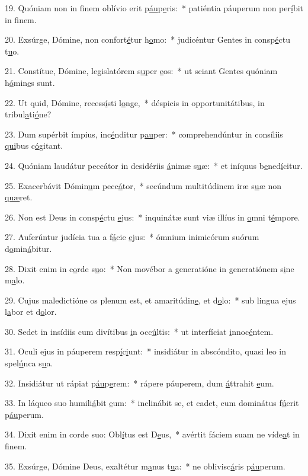 19. Quóniam non in finem oblívio erit p\uline{áu}p\uline{e}ris:~* patiéntia páuperum non per\uline{í}bit in f\uline{i}nem.\par 
20. Exsúrge, Dómine, non confort\uline{é}tur h\uline{o}mo:~* judicéntur Gentes in consp\uline{é}ctu t\uline{u}o.\par 
21. Constítue, Dómine, legislatórem s\uline{u}per \uline{e}os:~* ut sciant Gentes quóniam h\uline{ó}min\uline{e}s sunt.\par 
22. Ut quid, Dómine, recess\uline{í}sti l\uline{o}nge,~* déspicis in opportunitátibus, in tribul\uline{a}ti\uline{ó}ne?\par 
23. Dum supérbit ímpius, inc\uline{é}nditur p\uline{au}per:~* comprehendúntur in consíliis \uline{qui}bus c\uline{ó}gitant.\par 
24. Quóniam laudátur peccátor in desidériis \uline{á}nimæ s\uline{u}æ:~* et iníquus b\uline{e}ned\uline{í}citur.\par 
25. Exacerbávit Dómin\uline{u}m pecc\uline{á}tor,~* secúndum multitúdinem iræ s\uline{u}æ non \uline{quæ}ret.\par 
26. Non est Deus in consp\uline{é}ctu \uline{e}jus:~* inquinátæ sunt viæ illíus in \uline{o}mni t\uline{é}mpore.\par 
27. Auferúntur judícia tua a f\uline{á}cie \uline{e}jus:~* ómnium inimicórum suórum d\uline{o}min\uline{á}bitur.\par 
28. Dixit enim in c\uline{o}rde s\uline{u}o:~* Non movébor a generatióne in generatiónem s\uline{i}ne m\uline{a}lo.\par 
29. Cujus maledictióne os plenum est, et amaritúdin\uline{e}, et d\uline{o}lo:~* sub lingua ejus l\uline{a}bor et d\uline{o}lor.\par 
30. Sedet in insídiis cum divítibus \uline{i}n occ\uline{ú}ltis:~* ut interfíciat \uline{i}nnoc\uline{é}ntem.\par 
31. Oculi ejus in páuperem resp\uline{í}c\uline{i}unt:~* insidiátur in abscóndito, quasi leo in spel\uline{ú}nca s\uline{u}a.\par 
32. Insidiátur ut rápiat p\uline{áu}p\uline{e}rem:~* rápere páuperem, dum \uline{á}ttrahit \uline{e}um.\par 
33. In láqueo suo humili\uline{á}bit \uline{e}um:~* inclinábit se, et cadet, cum dominátus f\uline{ú}erit p\uline{áu}perum.\par 
34. Dixit enim in corde suo: Obl\uline{í}tus est D\uline{e}us,~* avértit fáciem suam ne víde\uline{a}t in f\uline{i}nem.\par 
35. Exsúrge, Dómine Deus, exaltétur m\uline{a}nus t\uline{u}a:~* ne oblivisc\uline{á}ris p\uline{áu}perum.\par 

